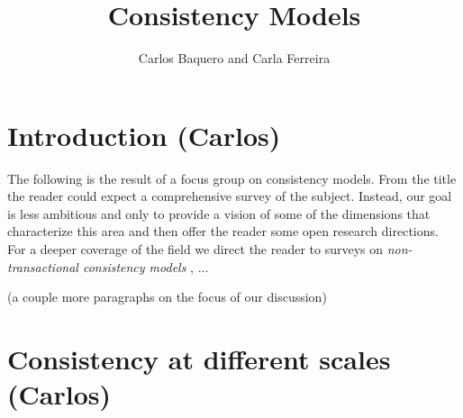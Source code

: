 %

\begin{bibunit}
	
	\title*{Consistency Models}
	\author{Carlos Baquero and Carla Ferreira}
	
	\maketitle
	

        \section{Introduction (Carlos)}

        The following is the result of a focus group on consistency models. From the title the reader could expect a comprehensive survey of the subject. Instead, our goal is less ambitious and only to provide a vision of some of the dimensions that characterize this area and then offer the reader some open research directions. For a deeper coverage of the field we direct the reader to surveys on \emph{non-transactional consistency models} \cite{Viotti:2016:CND:2911992.2926965}, ...  %

        (a couple more paragraphs on the focus of our discussion)


        \section{Consistency at different scales (Carlos)}\label{sec:1}



\end{bibunit}
